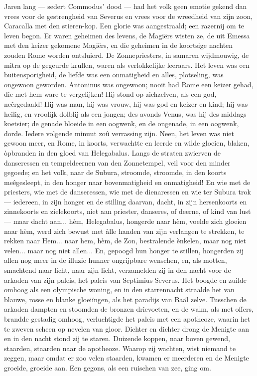 \documentclass[a4paper, 12pt, oneside, dutch]{article}
\begin{document}
Jaren lang --- sedert Commodus' dood --- had het volk geen emotie gekend dan vrees voor de gestrengheid van Severus en vrees voor de wreedheid van zijn zoon, Caracalla met den stieren-kop. Een glorie was aangestraald; een razernij om te leven begon. Er waren geheimen des levens, de Magiërs wisten ze, de uit Emessa met den keizer gekomene Magiërs, en die geheimen in de koortsige nachten zouden Rome worden ontsluierd. De Zonnepriesters, in samaren wijdmouwig, de mitra op de gegeurde krullen, waren als verlokkelijke leeraars. Het leven was een buitensporigheid, de liefde was een onmatigheid en alles, plotseling, was ongewoon geworden. Antoninus was ongewoon; nooit had Rome een keizer gehad, die met hem ware te vergelijken! Hij stond op zichzelven, als een god, neêrgedaald! Hij was man, hij was vrouw, hij was god en keizer en kind; hij was heilig, en vroolijk dolblij als een jongen; des avonds Venus, was hij des middags koetsier; de genade bloeide in een oogwenk, en de ongenade, in een oogwenk, dorde. Iedere volgende minuut zoû verrassing zijn. Neen, het leven was niet gewoon meer, en Rome, in koorts, verwachtte en leerde en wilde gloeien, blaken, òpbranden in den gloed van Helegabalus. Langs de straten zwierven de danseressen en tempeldeernen van den Zonnetempel, veil voor den minder gegoede; en het volk, naar de Subura, stroomde, stroomde, in den koorts meêgesleept, in den honger naar bovenmatigheid en onmatigheid! En wie met de priesters, wie met de danseressen, wie met de dienaressen en wie ter Subura trok --- iedereen, in zijn honger en de stilling daarvan, dacht, in zijn hersenkoorts en zinnekoorts en zielekoorts, niet aan priester, danseres, of deerne, of kind van lust --- maar dacht aan... hèm, Helegabalus, hongerde naar hèm, voelde zich gloeien naar hèm, werd zich bewust met àlle handen van zijn verlangen te strekken, te rekken naar Hem... naar hem, hèm, de Zon, bestralende ènkelen, maar nog niet velen... maar nog niet allen... En, gepoogd hun honger te stillen, hongerden zij allen nog meer in de illuzie hunner ongrijpbare wenschen, en, als motten, smachtend naar licht, naar zijn licht, verzamelden zij in den nacht voor de arkaden van zijn paleis, het paleis van Septimius Severus. Het boogde en zuilde omhoog als een olympische woning, en in den starrennacht straalde het van blauwe, rosse en blanke gloeiïngen, als het paradijs van Baäl zelve. Tusschen de arkaden dampten en stoomden de bronzen drievoeten, en de walm, als met offers, brandde gestadig omhoog, verluchtigde het paleis met een apotheoze, waarin het te zweven scheen op nevelen van gloor. Dichter en dichter drong de Menigte aan en in den nacht stond zij te staren. Duizende koppen, naar boven gewend, staarden, staarden naar de apotheoze. Waarop zij wachten, wist niemand te zeggen, maar omdat er zoo velen staarden, kwamen er meerderen en de Menigte groeide, groeide aan. Een gegons, als een ruischen van zee, ging om.
\end{document}
